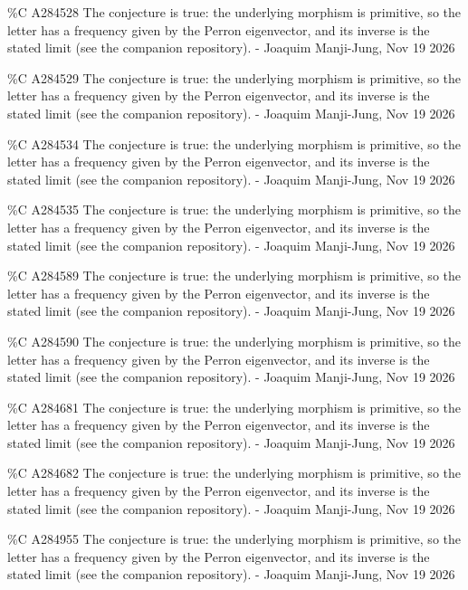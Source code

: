 {\%C A284528 The conjecture is true: the underlying morphism is primitive, so the letter has a frequency given by the Perron eigenvector, and its inverse is the stated limit (see the companion repository). - Joaquim Manji-Jung, Nov 19 2026\par
\%C A284529 The conjecture is true: the underlying morphism is primitive, so the letter has a frequency given by the Perron eigenvector, and its inverse is the stated limit (see the companion repository). - Joaquim Manji-Jung, Nov 19 2026\par
\%C A284534 The conjecture is true: the underlying morphism is primitive, so the letter has a frequency given by the Perron eigenvector, and its inverse is the stated limit (see the companion repository). - Joaquim Manji-Jung, Nov 19 2026\par
\%C A284535 The conjecture is true: the underlying morphism is primitive, so the letter has a frequency given by the Perron eigenvector, and its inverse is the stated limit (see the companion repository). - Joaquim Manji-Jung, Nov 19 2026\par
\%C A284589 The conjecture is true: the underlying morphism is primitive, so the letter has a frequency given by the Perron eigenvector, and its inverse is the stated limit (see the companion repository). - Joaquim Manji-Jung, Nov 19 2026\par
\%C A284590 The conjecture is true: the underlying morphism is primitive, so the letter has a frequency given by the Perron eigenvector, and its inverse is the stated limit (see the companion repository). - Joaquim Manji-Jung, Nov 19 2026\par
\%C A284681 The conjecture is true: the underlying morphism is primitive, so the letter has a frequency given by the Perron eigenvector, and its inverse is the stated limit (see the companion repository). - Joaquim Manji-Jung, Nov 19 2026\par
\%C A284682 The conjecture is true: the underlying morphism is primitive, so the letter has a frequency given by the Perron eigenvector, and its inverse is the stated limit (see the companion repository). - Joaquim Manji-Jung, Nov 19 2026\par
\%C A284955 The conjecture is true: the underlying morphism is primitive, so the letter has a frequency given by the Perron eigenvector, and its inverse is the stated limit (see the companion repository). - Joaquim Manji-Jung, Nov 19 2026\par
}
